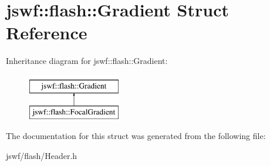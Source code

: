 \hypertarget{structjswf_1_1flash_1_1_gradient}{\section{jswf\+:\+:flash\+:\+:Gradient Struct Reference}
\label{structjswf_1_1flash_1_1_gradient}
}
Inheritance diagram for jswf\+:\+:flash\+:\+:Gradient\+:\begin{figure}[H]
\begin{center}
\leavevmode
\includegraphics[height=2.000000cm]{structjswf_1_1flash_1_1_gradient}
\end{center}
\end{figure}


The documentation for this struct was generated from the following file\+:\begin{DoxyCompactItemize}
\item 
jswf/flash/Header.\+h\end{DoxyCompactItemize}

